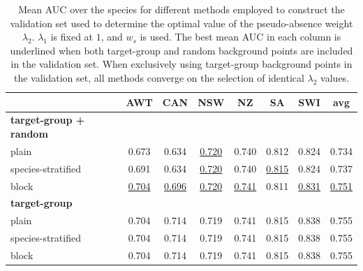 
\begin{table}[]
\centering
\caption{Mean AUC over the species for different methods employed to construct the validation set used to determine the optimal value of the pseudo-absence weight $\lambda_2$. $\lambda_1$ is fixed at $1$, and $w_s$ is used. The best mean AUC in each column is underlined when both target-group and random background points are included in the validation set. When exclusively using target-group background points in the validation set, all methods converge on the selection of identical $\lambda_2$ values.}

\setlength{\tabcolsep}{0.46\tabcolsep}  %
\renewcommand{\arraystretch}{1.2} %
\begin{tabular}{lccccccc}
                                    & AWT   & CAN   & NSW   & NZ    & SA    & SWI   & \textbf{avg}   \\ \hline \hline
\textbf{target-group + random} \\
plain                              & 0.673 & 0.634 & \underline{0.720} & 0.740 & 0.812 & 0.824 & 0.734 \\
species-stratified                 & 0.691 & 0.634 & \underline{0.720} & 0.740 & \underline{0.815} & 0.824 & 0.737 \\
block                              & \underline{0.704} & \underline{0.696} & \underline{0.720} & \underline{0.741} & 0.811 & \underline{0.831} & \underline{0.751} \\
\hline
\textbf{target-group} \\
plain              & 0.704 & 0.714 & 0.719 & 0.741 & 0.815 & 0.838 & 0.755 \\
species-stratified         & 0.704 & 0.714 & 0.719 & 0.741 & 0.815 & 0.838 & 0.755 \\
block              & 0.704 & 0.714 & 0.719 & 0.741 & 0.815 & 0.838 & 0.755 \\
\hline

\end{tabular}

\label{tab:crossvalidation}
\end{table}
